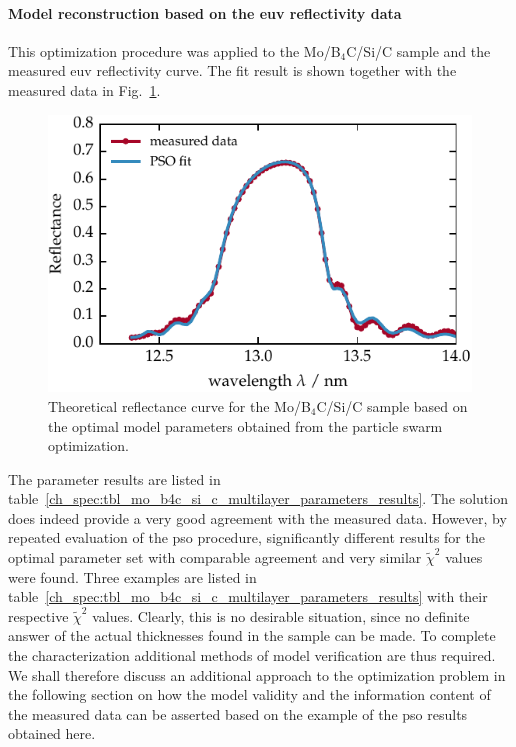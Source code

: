 \paragraph{Model reconstruction based on the \gls{euv} reflectivity data}
This optimization procedure was applied to the Mo/B$_4$C/Si/C sample and the measured \gls{euv} reflectivity curve. The fit result is shown together with the measured data in Fig.~\ref{ch_spec:fig_ptb17_reflectance_AOI_15_fitted}.
\begin{figure}[htbp]
\centering
\includegraphics{img/PTB17_reflectance_AOI_15_fitted}
\caption[Theoretical reflectance curve for the Mo/B$_4$C/Si/C sample based on the optimal model parameters.]{Theoretical reflectance curve for the Mo/B$_4$C/Si/C sample based on the optimal model parameters obtained from the particle swarm optimization.}
\label{ch_spec:fig_ptb17_reflectance_AOI_15_fitted}
\end{figure}
The parameter results are listed in table~\ref{ch_spec:tbl_mo_b4c_si_c_multilayer_parameters_results}. The solution does indeed provide a very good agreement with the measured data. However, by repeated evaluation of the \gls{pso} procedure, significantly different results for the optimal parameter set with comparable agreement and very similar $\tilde{\chi}^2$ values were found. Three examples are listed in table~\ref{ch_spec:tbl_mo_b4c_si_c_multilayer_parameters_results} with their respective $\tilde{\chi}^2$ values. Clearly, this is no desirable situation, since no definite answer of the actual thicknesses found in the sample can be made. To complete the characterization additional methods of model verification are thus required. We shall therefore discuss an additional approach to the optimization problem in the following section on how the model validity and the information content of the measured data can be asserted based on the example of the \gls{pso} results obtained here.
